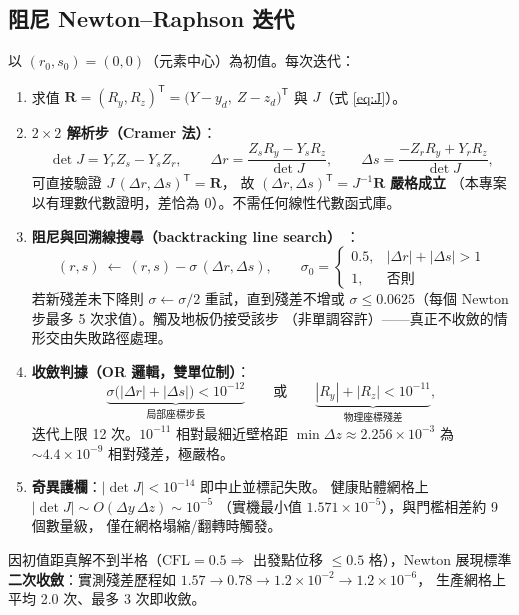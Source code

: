 \documentclass[11pt,a4paper]{article}
\begin{document}
\subsection{阻尼 Newton--Raphson 迭代}
\label{sec:newton}
以 $(r_0,s_0)=(0,0)$（元素中心）為初值。每次迭代：
\begin{enumerate}[itemsep=1pt]
\item 求值 $\bm{R}=(R_y,R_z)^\mathsf{T}=\bigl(Y-y_d,\ Z-z_d\bigr)^\mathsf{T}$ 與
      $J$（式 \eqref{eq:J}）。
\item \textbf{$2\times2$ 解析步（Cramer 法）}：
\begin{equation}
\det J = Y_rZ_s-Y_sZ_r,\qquad
\Delta r=\frac{Z_sR_y-Y_sR_z}{\det J},\qquad
\Delta s=\frac{-Z_rR_y+Y_rR_z}{\det J},
\label{eq:cramer}
\end{equation}
可直接驗證 $J\,(\Delta r,\Delta s)^\mathsf{T}=\bm{R}$，
故 $(\Delta r,\Delta s)^\mathsf{T}=J^{-1}\bm{R}$ \textbf{嚴格成立}
（本專案以有理數代數證明，差恰為 0）。不需任何線性代數函式庫。
\item \textbf{阻尼與回溯線搜尋（backtracking line search）}
      \cite{Press2007,DennisSchnabel1996}：
\begin{equation}
(r,s)\ \leftarrow\ (r,s)-\sigma\,(\Delta r,\Delta s),\qquad
\sigma_0=\begin{cases}0.5,&|\Delta r|+|\Delta s|>1\\ 1,&\text{否則}\end{cases}
\end{equation}
若新殘差未下降則 $\sigma\leftarrow\sigma/2$ 重試，直到殘差不增或
$\sigma\le 0.0625$（每個 Newton 步最多 5 次求值）。觸及地板仍接受該步
（非單調容許）——真正不收斂的情形交由失敗路徑處理。
\item \textbf{收斂判據（OR 邏輯，雙單位制）}：
\begin{equation}
\underbrace{\sigma\bigl(|\Delta r|+|\Delta s|\bigr)<10^{-12}}_{\text{局部座標步長}}
\qquad\text{或}\qquad
\underbrace{|R_y|+|R_z|<10^{-11}}_{\text{物理座標殘差}},
\label{eq:converge}
\end{equation}
迭代上限 12 次。$10^{-11}$ 相對最細近壁格距
$\min\Delta z\approx2.256\times10^{-3}$ 為 $\sim4.4\times10^{-9}$
相對殘差，極嚴格。
\item \textbf{奇異護欄}：$|\det J|<10^{-14}$ 即中止並標記失敗。
      健康貼體網格上 $|\det J|\sim O(\Delta y\,\Delta z)\sim10^{-5}$
      （實機最小值 $1.571\times10^{-5}$），與門檻相差約 9 個數量級，
      僅在網格塌縮/翻轉時觸發。
\end{enumerate}
因初值距真解不到半格（$\mathrm{CFL}=0.5\Rightarrow$ 出發點位移
$\le0.5$ 格），Newton 展現標準\textbf{二次收斂}：實測殘差歷程如
$1.57\to0.78\to1.2\times10^{-2}\to1.2\times10^{-6}$，
生產網格上平均 2.0 次、最多 3 次即收斂。
\end{document}
